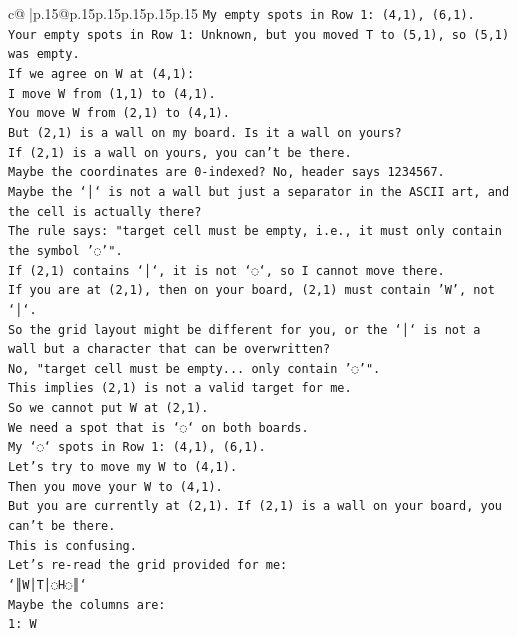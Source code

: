 \documentclass{article}
\begin{document}
{\begin{supertabular}{c@{$\;$}|p{.15\linewidth}@{}p{.15\linewidth}p{.15\linewidth}p{.15\linewidth}p{.15\linewidth}p{.15\linewidth}}
{{{\texttt{My empty spots in Row 1: (4,1), (6,1).} \\
\texttt{Your empty spots in Row 1: Unknown, but you moved T to (5,1), so (5,1) was empty.} \\
\texttt{If we agree on W at (4,1):} \\
\texttt{I move W from (1,1) to (4,1).} \\
\texttt{You move W from (2,1) to (4,1).} \\
\texttt{But (2,1) is a wall on my board. Is it a wall on yours?} \\
\texttt{If (2,1) is a wall on yours, you can't be there.} \\
\texttt{Maybe the coordinates are 0{-}indexed? No, header says 1234567.} \\
\texttt{Maybe the `│` is not a wall but just a separator in the ASCII art, and the cell is actually there?} \\
\texttt{The rule says: "target cell must be empty, i.e., it must only contain the symbol '◌'".} \\
\texttt{If (2,1) contains `│`, it is not `◌`, so I cannot move there.} \\
\texttt{If you are at (2,1), then on your board, (2,1) must contain 'W', not `│`.} \\
\texttt{So the grid layout might be different for you, or the `│` is not a wall but a character that can be overwritten?} \\
\texttt{No, "target cell must be empty... only contain '◌'".} \\
\texttt{This implies (2,1) is not a valid target for me.} \\
\texttt{So we cannot put W at (2,1).} \\
\texttt{We need a spot that is `◌` on both boards.} \\
\texttt{My `◌` spots in Row 1: (4,1), (6,1).} \\
\texttt{Let's try to move my W to (4,1).} \\
\texttt{Then you move your W to (4,1).} \\
\texttt{But you are currently at (2,1). If (2,1) is a wall on your board, you can't be there.} \\
\texttt{This is confusing.} \\
\texttt{Let's re{-}read the grid provided for me:} \\
\texttt{`║W│T│◌H◌║`} \\
\texttt{Maybe the columns are:} \\
\texttt{1: W} \\
}}}
\end{supertabular}}
\end{document}
